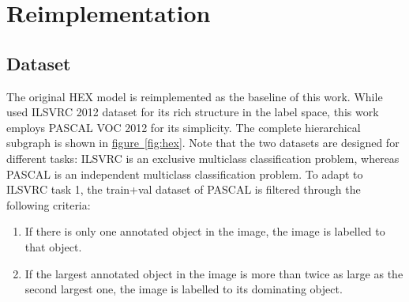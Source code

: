 \documentclass[11pt,a4paper]{book}
\begin{document}
\chapter{Reimplementation}
\section{Dataset}
\label{sec:data}

The original HEX model is reimplemented as the baseline of this work. While \cite{deng2014large} used ILSVRC 2012 dataset for its rich structure in the label space, this work employs PASCAL VOC 2012 \cite{pascal-voc-2012} for its simplicity. The complete hierarchical subgraph is shown in \hyperref[fig:hex]{figure~\ref{fig:hex}}. Note that the two datasets are designed for different tasks: ILSVRC is an exclusive multiclass classification problem, whereas PASCAL is an independent multiclass classification problem. To adapt to ILSVRC task 1, the train+val dataset of PASCAL is filtered through the following criteria:
\begin{enumerate}
\item If there is only one annotated object in the image, the image is labelled to that object.
\item If the largest annotated object in the image is more than twice as large as the second largest one, the image is labelled to its dominating object.
\end{enumerate}
\end{document}
